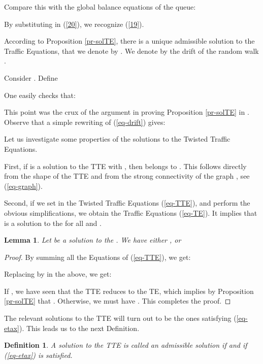 \documentclass[11pt,a4paper]{article}
\newtheorem{lemma}[theorem]{Lemma}
\newtheorem{definition}[theorem]{Definition}
\theoremstyle{remark}
\def\eref#1{(\ref{#1})}
\begin{document}
Compare this with the global balance equations of the  queue:

By substituting  in (\ref{20}), we recognize
(\ref{19}).

\medskip

According to Proposition \ref{pr-solTE}, there is a unique admissible
solution to the Traffic Equations, that we denote by . We denote by  the
drift of the random walk .

Consider . Define

One easily checks that:

This point was the crux of
the argument in proving Proposition \ref{pr-solTE} in
\cite{mair04}. Observe that a simple rewriting of \eref{eq-drift} gives:


\medskip

Let us investigate some properties of the solutions to the
Twisted Traffic Equations.

\medskip

First, if  is a solution to the TTE with ,
then  belongs to . This follows directly from the shape of
the TTE and from the strong connectivity of the graph
, see \eref{eq-graph}. 

Second, if we set  in the Twisted Traffic Equations \eref{eq-TTE}, and perform the obvious
simplifications, we obtain the Traffic Equations \eref{eq-TE}.
It implies that  is a solution to the  for
all  and .

\begin{lemma}\label{le-tte1}
Let  be a solution to the
. We have either , or

\end{lemma}

\begin{proof}
By summing all the Equations of \eref{eq-TTE}, we get:


Replacing  by  in the above, we get:


If , we have seen that the TTE reduces to the TE, which implies by
Proposition \ref{pr-solTE} that . Otherwise, we must have
. This completes the
proof.
\end{proof}

The relevant solutions to the TTE will turn out to be the ones
satisfying \eref{eq-etax}. This leads us to the next
Definition.

\begin{definition}\label{de-admissible}
A solution  to the TTE is called an {\em admissible solution} if
 and if \eref{eq-etax} is satisfied.
\end{definition}
\end{document}
